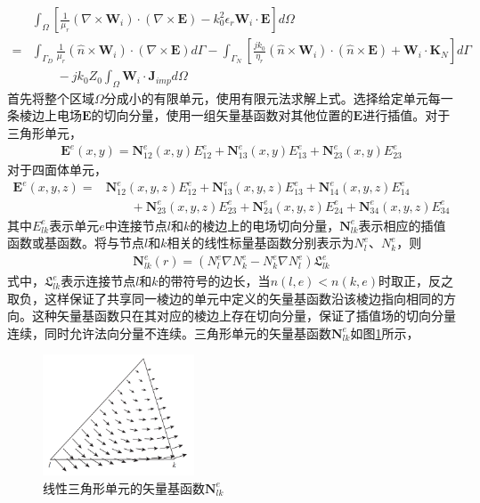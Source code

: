 \documentclass{article}
\numberwithin{equation}{section}
\begin{document}
\begin{align}
    \label{eq:eq754}
     &\int_{\Omega}\left[\frac{1}{\mu_r}\left(\nabla\times\mathbf{W}_i\right)\cdot\left(\nabla\times\mathbf{E}\right)-k_0^2\epsilon_r\mathbf{W}_i\cdot\mathbf{E}\right]d\Omega \nonumber \\
    =&\int_{\Gamma_D}\frac{1}{\mu_r}\left(\hat{n}\times\mathbf{W}_i\right)\cdot\left(\nabla\times\mathbf{E}\right)d\Gamma-\int_{\Gamma_N}\left[\frac{jk_0}{\eta_r}\left(\hat{n}\times\mathbf{W}_i\right)\cdot\left(\hat{n}\times\mathbf{E}\right)+\mathbf{W}_i\cdot\mathbf{K}_N\right]d\Gamma \nonumber \\
     &\qquad-jk_0Z_0\int_{\Omega}\mathbf{W}_i\cdot\mathbf{J}_{imp}d\Omega
\end{align}
首先将整个区域$\Omega$分成小的有限单元，使用有限元法求解上式。选择给定单元每一条棱边上电场$\mathbf{E}$的切向分量，使用一组矢量基函数对其他位置的$\mathbf{E}$进行插值。对于三角形单元，
\begin{align}
    \label{eq:eq755}
    \mathbf{E}^e(x,y)=\mathbf{N}_{12}^e(x,y)E^e_{12}+\mathbf{N}_{13}^e(x,y)E^e_{13}+\mathbf{N}_{23}^e(x,y)E^e_{23}
\end{align}
对于四面体单元，
\begin{align}
    \label{eq:eq756}
    \mathbf{E}^e(x,y,z)=&\mathbf{N}_{12}^e(x,y,z)E^e_{12}+\mathbf{N}_{13}^e(x,y,z)E^e_{13}+\mathbf{N}_{14}^e(x,y,z)E^e_{14} \nonumber \\
                        &\qquad+\mathbf{N}_{23}^e(x,y,z)E^e_{23}+\mathbf{N}_{24}^e(x,y,z)E^e_{24}+\mathbf{N}_{34}^e(x,y,z)E^e_{34}
\end{align}
其中$E_{lk}^e$表示单元$e$中连接节点$l$和$k$的棱边上的电场切向分量，$\mathbf{N}_{lk}^e$表示相应的插值函数或基函数。将与节点$l$和$k$相关的线性标量基函数分别表示为$N_{l}^e$、$N_{k}^e$，则
\begin{align}
    \label{eq:eq757}
    \mathbf{N}_{lk}^e(r)=(N_{l}^e\nabla N_{k}^e-N_{k}^e\nabla N_{l}^e)\mathfrak{L}_{lk}^e
\end{align}
式中，$\mathfrak{L}_{lk}^e$表示连接节点$l$和$k$的带符号的边长，当$n(l,e)<n(k,e)$时取正，反之取负，这样保证了共享同一棱边的单元中定义的矢量基函数沿该棱边指向相同的方向。这种矢量基函数只在其对应的棱边上存在切向分量，保证了插值场的切向分量连续，同时允许法向分量不连续。三角形单元的矢量基函数$\mathbf{N}_{lk}^e$如图\ref{fig:fig61}所示，
\begin{figure}[ht]
    \centering
    \includegraphics[width=0.4\textwidth]{线性三角形单元的矢量基函数Nlke.PNG}
    \caption{线性三角形单元的矢量基函数$\mathbf{N}_{lk}^e$}
    \label{fig:fig61}
\end{figure}
\end{document}
